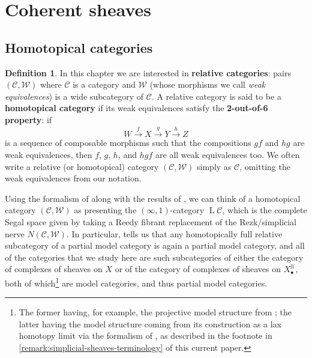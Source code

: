 \documentclass[11pt,fleqn]{article}
\theoremstyle{plain}
\theoremstyle{definition}
\newtheorem{definition}[theorem]{Definition}
\theoremstyle{remark}
\numberwithin{equation}{theorem}
\newcommand{\cover}{\mathcal{U}}
\newcommand{\define}[1]{\textbf{#1}}
\newcommand{\nerve}[1]{X_{#1}^\cover}
\DeclareMathOperator{\LL}{L}
\begin{document}
\section{Coherent sheaves}\label{section:coherent-sheaves}


    \subsection{Homotopical categories}

        \begin{definition}
            In this chapter we are interested in \define{relative categories}: pairs $(\mathcal{C},\mathcal{W})$ where $\mathcal{C}$ is a category and $\mathcal{W}$ (whose morphisms we call \emph{weak equivalences}) is a wide subcategory of $\mathcal{C}$.
            A relative category is said to be a \define{homotopical category} if its weak equivalences satisfy the \define{2-out-of-6 property}: if
            \[
                W\xrightarrow{f}X\xrightarrow{g}Y\xrightarrow{h}Z
            \]
            is a sequence of composable morphisms such that the compositions $gf$ and $hg$ are weak equivalences, then $f$, $g$, $h$, and $hgf$ are all weak equivalences too.
            We often write a relative (or homotopical) category $(\mathcal{C},\mathcal{W})$ simply as $\mathcal{C}$, omitting the weak equivalences from our notation.

            Using the formalism of \cite{Rezk2000} along with the results of \cite{Barwick&Kan2013}, we can think of a homotopical category $(\mathcal{C},\mathcal{W})$ as presenting the $(\infty,1)$-category $\LL{\mathcal{C}}$, which is the complete Segal space given by taking a Reedy fibrant replacement of the Rezk/simplicial nerve $N(\mathcal{C},\mathcal{W})$.
            In particular, \cite[§1.2~(ii)]{Barwick&Kan2013} tells us that any homotopically full relative subcategory of a partial model category is again a partial model category, and all of the categories that we study here are such subcategories of either the category of complexes of sheaves on $X$ or of the category of complexes of sheaves on $\nerve{\bullet}$, both of which\footnote{The former having, for example, the projective model structure from \cite{Hovey2001}; the latter having the model structure coming from its construction as a lax homotopy limit via the formalism of \cite{Bergner2012}, as described in the footnote in \cref{remark:simplicial-sheaves-terminology} of this current paper.} are model categories, and thus partial model categories.
        \end{definition}
\end{document}
